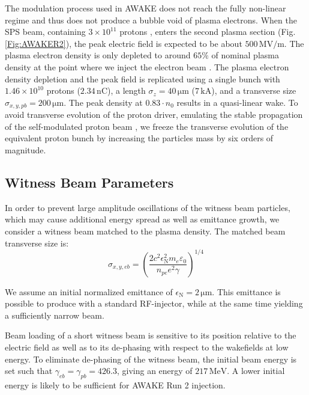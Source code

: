 \documentclass[aps,prstab,reprint,amsmath,amssymb,groupedaddress]{revtex4-1}
\newcommand{\unit}[1]{\,\mathrm{#1}}
\newcommand{\funit}[2]{\,\mathrm{#1}/\mathrm{#2}}
\newcommand{\nexp}[1]{\times 10^{#1}}
\begin{document}
The modulation process used in AWAKE does not reach the fully non-linear regime and thus does not produce a bubble void
of plasma electrons. When the SPS beam, containing $3\nexp{11}$ protons \cite{gschwendtner:2016}, enters the second
plasma section (Fig. \ref{Fig:AWAKER2}), the peak electric field is expected to be about $500\funit{MV}{m}$. The
plasma electron density is only depleted to around $65\%$ of nominal plasma density at the point where we inject the
electron beam \cite{awake_collaboration:2016}. The plasma electron density depletion and the peak field is replicated
using a single bunch with $1.46\nexp{10}$ protons ($2.34\unit{nC}$), a length $\sigma_{z} = 40\unit{\mu m}$
($7\unit{kA}$), and a transverse size $\sigma_{x,y,pb} = 200\unit{\mu m}$. The peak density at $0.83\cdot n_{0}$ results
in a quasi-linear wake. To avoid transverse evolution of the proton driver, emulating the stable propagation of the
self-modulated proton beam \cite{lotov:2011, lotov:2015, caldwell:2011}, we freeze the transverse evolution of the
equivalent proton bunch by increasing the particles mass by six orders of magnitude.

\subsection{Witness Beam Parameters}\label{S:M:Setup}

In order to prevent large amplitude oscillations of the witness beam particles, which may cause additional energy spread
as well as emittance growth, we consider a witness beam matched to the plasma density. The matched beam transverse size
is:
\begin{equation}
    \sigma_{x,y,eb}=\left(\frac{2c^{2}\epsilon_{\mathrm{N}}^{2}m_{e}\varepsilon_{0}}{n_{pe}e^{2}\gamma}\right)^{1/4}
    \label{EQ:Matched}
\end{equation}

We assume an initial normalized emittance of $\epsilon_{\mathrm{N}} = 2\unit{\mu m}$. This emittance is possible to
produce with a standard RF-injector, while at the same time yielding a sufficiently narrow beam.

Beam loading of a short witness beam is sensitive to its position relative to the electric field \cite{tzoufras:2009}
as well as to its de-phasing with respect to the wakefields at low energy. To eliminate de-phasing of the witness beam,
the initial beam energy is set such that $\gamma_{eb} = \gamma_{pb} = 426.3$, giving an energy of $217\unit{MeV}$. A
lower initial energy is likely to be sufficient for AWAKE Run 2 injection.
\end{document}
